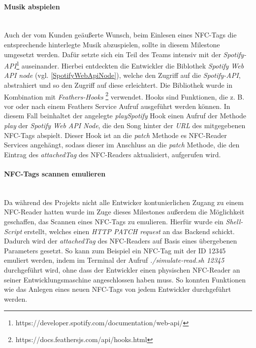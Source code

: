 \documentclass[10pt, a4paper]{article}
\begin{document}
\paragraph*{Musik abspielen} $~$ \\
Auch der vom Kunden geäußerte Wunsch, beim Einlesen eines NFC-Tags die entsprechende hinterlegte Musik abzuspielen, sollte in diesem Milestone umgesetzt werden.
Dafür setzte sich ein Teil des Teams intensiv mit der \textit{Spotify-API}\footnote{https://developer.spotify.com/documentation/web-api/} auseinander.
Hierbei entdeckten die Entwickler die Biblothek \textit{Spotify Web API node} (vgl. \ref*{SpotifyWebApiNode}), welche den Zugriff auf die \textit{Spotify-API},
abstrahiert und so den Zugriff auf diese erleichtert. Die Bibliothek wurde in Kombination mit \textit{Feathers-Hooks}
\footnote{https://docs.feathersjs.com/api/hooks.html} verwendet. Hooks sind Funktionen, die z. B. vor oder nach einem Feathers Service Aufruf ausgeführt werden
können. In diesem Fall beinhaltet der angelegte \textit{playSpotify} Hook einen Aufruf der Methode \textit{play} der \textit{Spotify Web API Node}, die den Song
hinter der \textit{URL} des mitgegebenen NFC-Tags abspielt. Dieser Hook ist an die \textit{patch} Methode es NFC-Reader Services angehängt, sodass dieser im
Anschluss an die \textit{patch} Methode, die den Eintrag des \textit{attachedTag} des NFC-Readers aktualisiert, aufgerufen wird.

\paragraph*{NFC-Tags scannen emulieren} $~$ \\
Da während des Projekts nicht alle Entwicker kontunierlichen Zugang zu einem NFC-Reader hatten wurde im Zuge dieses Milestones außerdem die Möglichkeit
geschaffen, das Scannen eines NFC-Tags zu emulieren. Hierfür wurde ein \textit{Shell-Script} erstellt, welches einen \textit{HTTP PATCH request} an
das Backend schickt. Dadurch wird der \textit{attachedTag} des NFC-Readers auf Basis eines übergebenen Parameters gesetzt. So kann zum Beispiel ein NFC-Tag mit
der ID 12345 emuliert werden, indem im Terminal der Aufruf \textit{./simulate-read.sh 12345} durchgeführt wird, ohne dass der Entwickler einen physischen NFC-Reader
an seiner Entwicklungsmaschine angeschlossen haben muss. So konnten Funktionen wie das Anlegen eines neuen NFC-Tags von jedem Entwickler durchgeführt werden.
\end{document}
